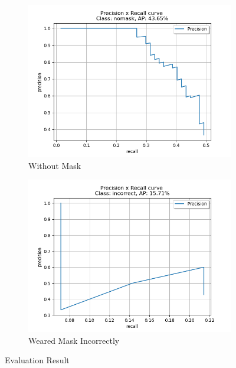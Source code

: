 \documentclass[10pt,a4paper]{report}
\begin{document}
\begin{figure}[hbtp]
\begin{subfigure}[b]{0.8\textwidth}
     \end{subfigure}
     \hfill
     \begin{subfigure}[b]{0.8\textwidth}
         \centering
         \includegraphics[width=\textwidth]{./imgs/nomask.png}
         \caption{Without Mask}
     \end{subfigure}
          \hfill
     \begin{subfigure}[b]{0.8\textwidth}
         \centering
         \includegraphics[width=\textwidth]{./imgs/incorrect.png}
         \caption{Weared Mask Incorrectly}
     \end{subfigure}

        \caption{Evaluation Result}
        \label{fig:e}
\end{figure}
\end{document}
